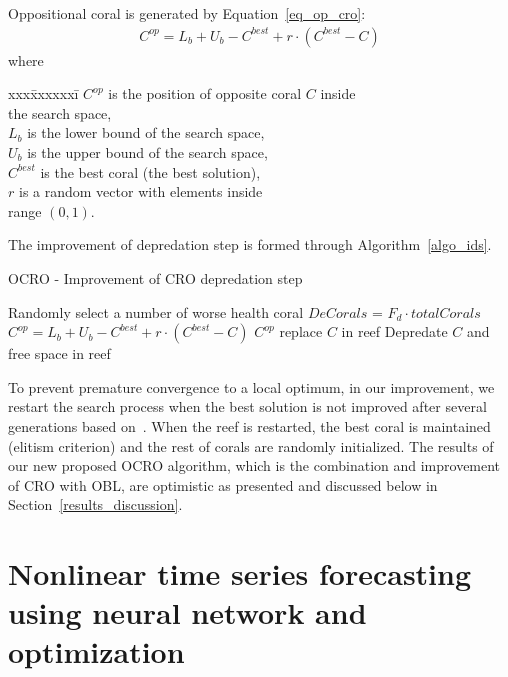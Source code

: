 \documentclass[11pt,twoside]{article}
\begin{document}
\begin{multicols}{2}
Oppositional coral is generated by Equation~\ref{eq_op_cro}:
\begin{align} \label{eq_op_cro}
	C^{op} = L_b + U_b - C^{best} + r \cdot ( C^{best} - C)
\end{align}
where 
\begin{tabbing}
	xxx\=xxxxxxi\=\kill
	\>	$C^{op}$ 		\>	is the position of opposite coral $C$ inside  \\
	\> \phantom{inv}		\>	the search space, \\
	\>	$L_b$ 			\>	is the lower bound of the search space,	\\
	\>	$U_b$ 			\>	is the upper bound of the search space,	\\ 
	\>	$C^{best}$ 		\>	is the best coral (the best solution), 		\\
	\>	$r$ 			\>	is a random vector with elements inside  \\
	\> \phantom{inv}	\>	range $(0,1)$. 
\end{tabbing}

The improvement of depredation step is formed through Algorithm~\ref{algo_ids}.
\begin{algorithm*}
\caption{OCRO - Improvement of CRO depredation step }\label{algo_ids}
\begin{algorithmic}[!t]
   \State Randomly select a number of worse health coral $DeCorals$ = $F_{d} \cdot totalCorals$
       \State $C^{op} = L_b + U_b - C^{best} + r \cdot ( C^{best} - C )$
           \State $C^{op}$ replace $C$ in reef
       \Else
           \State Depredate $C$ and free space in reef
       \EndIf
    \EndFor
\end{algorithmic}
\end{algorithm*}
To prevent premature convergence to a local optimum, in our improvement, we restart the search process when the best solution is not improved after several generations based on~\citep{ref_Salcedo}. When the reef is restarted, the best coral is maintained (elitism criterion) and the rest of corals are randomly initialized. The results of our new proposed OCRO algorithm, which is the combination and improvement of CRO with OBL, are optimistic as presented and discussed below in Section~\ref{results_discussion}.

\section{Nonlinear time series forecasting using neural network and optimization}
\label{mlnn}


\end{multicols}
\end{document}
